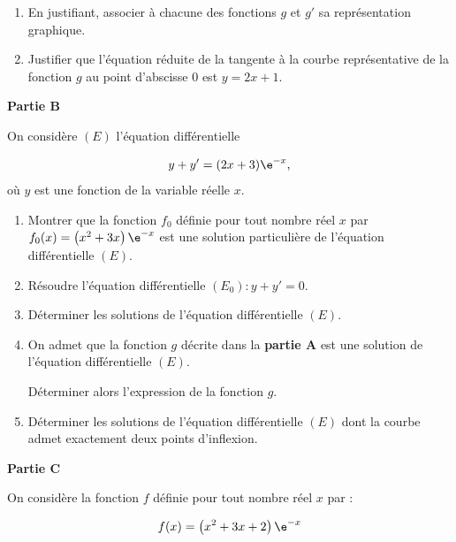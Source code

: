\begin{enumerate}
	\item En justifiant, associer à chacune des fonctions $g$ et $g'$ sa représentation graphique.
	\item Justifier que l'équation réduite de la tangente à la
courbe représentative de la fonction $g$ au point d'abscisse 0 est $y=2x + 1$.
\end{enumerate}

\medskip

\textbf{Partie B}

\medskip

On considère $(E)$ l'équation différentielle 

\[y+y'=(2x + 3) \e^{-x},\]
où $y$ est une fonction de la variable réelle $x$.

\medskip

\begin{enumerate}
\item Montrer que la fonction $f_{0}$ définie pour tout nombre réel $x$ par $f_{0}(x)=\left(x^{2}+3 x\right) \e^{-x}$ est une solution particulière de l'équation différentielle $(E)$.
\item Résoudre l'équation différentielle $\left(E_{0}\right): y+ y'= 0$.
\item Déterminer les solutions de l'équation différentielle $(E)$.
\item On admet que la fonction $g$ décrite dans la \textbf{partie A} est une solution de l'équation différentielle $(E)$.

Déterminer alors l'expression de la fonction $g$.
\item Déterminer les solutions de l'équation différentielle $(E)$ dont la courbe admet exactement deux points d'inflexion.
\end{enumerate}

\medskip

\textbf{Partie C}

\medskip

On considère la fonction $f$ définie pour tout nombre réel $x$ par :

\[f(x)=\left(x^{2}+3 x+2\right) \e^{-x}\]

